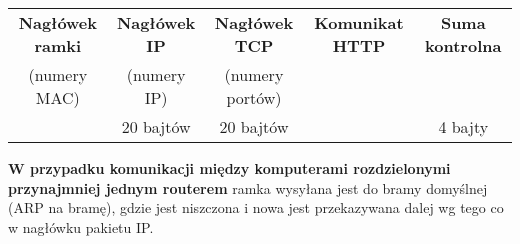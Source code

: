 \documentclass[../main.tex]{subfiles}
\begin{document}
    \begin{tabular}{|c|c|c|c|c|}
        \hline
        \textbf{Nagłówek ramki }& \textbf{Nagłówek IP }& \textbf{Nagłówek TCP }& \textbf{Komunikat HTTP }& \textbf{Suma kontrolna}\\
        (numery MAC) & (numery IP) & (numery portów) & & \\
        & 20 bajtów & 20 bajtów & & 4 bajty\\
        \hline
    \end{tabular}

    \textbf{W przypadku komunikacji między komputerami rozdzielonymi przynajmniej jednym routerem} ramka wysyłana jest do bramy domyślnej (ARP na bramę), gdzie jest niszczona
    i nowa jest przekazywana dalej wg tego co w nagłówku pakietu IP.
\end{document}
